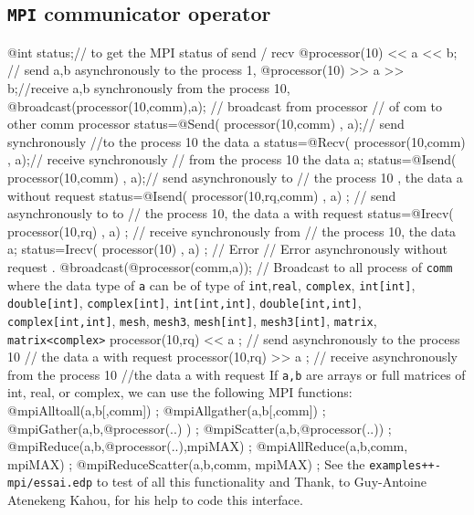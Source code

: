 \documentclass[a4paper,twoside,12pt]{book}
\begin{document}
\subsection{\texttt{MPI} communicator  operator}

\bFF
   @int status;// to get the MPI status of send / recv
   @processor(10) << a << b; // send a,b asynchronously to the process 1,
   @processor(10) >> a >> b;//receive a,b synchronously from the process 10,
   @broadcast(processor(10,comm),a); // broadcast from processor
   // of com  to other comm processor
   status=@Send( processor(10,comm) , a);// send synchronously
   //to the process 10 the data a
   status=@Recv( processor(10,comm) , a);// receive synchronously 
   // from the process 10 the data a;
   status=@Isend( processor(10,comm) , a);// send asynchronously to
    //  the process 10 , the data a without request
   status=@Isend( processor(10,rq,comm) , a) ; // send asynchronously to to
  //  the process 10, the data a with request
   status=@Irecv( processor(10,rq) , a) ; // receive synchronously from 
 // the process 10, the data a;
   \textRed status=Irecv( processor(10) , a) ; \textBlack // Error
// Error asynchronously without request .
@broadcast(@processor(comm,a)); //  Broadcast to all process of \texttt{comm}
\eFF
  where the data type of \texttt{a} can be of type of \texttt{int},\texttt{real}, \texttt{complex}, \texttt{int[int]}, \texttt{double[int]}, 
  \texttt{complex[int]}, \texttt{int[int,int]}, \texttt{double[int,int]}, \texttt{complex[int,int]},
       \texttt{mesh}, \texttt{mesh3}, \texttt{mesh[int]}, \texttt{mesh3[int]}, \texttt{matrix}, \texttt{matrix<complex>}
\bFF
    processor(10,rq) << a ; // send asynchronously to the process 10
    // the data a  with request
    processor(10,rq) >> a ; // receive asynchronously  from the process 10
    //the data a with request
\eFF
 If  \verb!a,b! are arrays or full matrices of int, real, or complex, we can
 use the following MPI functions:
  
\bFF
    @mpiAlltoall(a,b[,comm]) ;
    @mpiAllgather(a,b[,comm]) ;
    @mpiGather(a,b,@processor(..) ) ;
    @mpiScatter(a,b,@processor(..)) ;
    @mpiReduce(a,b,@processor(..),mpiMAX) ;
    @mpiAllReduce(a,b,comm, mpiMAX) ;
    @mpiReduceScatter(a,b,comm, mpiMAX) ;
\eFF
See the
  \texttt{examples++-mpi/essai.edp} to test of all this functionality and
Thank, to Guy-Antoine Atenekeng Kahou, for his help to code this interface.
\end{document}
